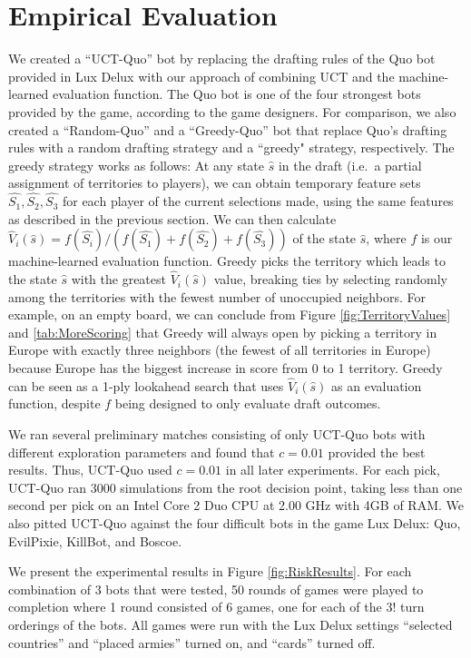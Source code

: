\documentclass[letterpaper]{article}
\numberwithin{equation}{section}
\numberwithin{theorem}{section}
\numberwithin{lemma}{section}
\numberwithin{df}{section}
\begin{document}
\section{Empirical Evaluation}


We created a ``UCT-Quo'' bot by replacing the drafting rules of the Quo bot provided in Lux Delux with our approach of combining UCT and the machine-learned evaluation function.  The Quo bot is one of the four strongest bots provided by the game, according to the game designers.  For comparison, we also created a ``Random-Quo'' and a ``Greedy-Quo'' bot that replace Quo's drafting rules with a random drafting strategy and a ``greedy" strategy, respectively.  The greedy strategy works as follows: At any state $\hat{s}$ in the draft (i.e.~a partial assignment of territories to players), we can obtain temporary feature sets $\hat{S_1}, \hat{S_2}, \hat{S_3}$ for each player of the current selections made, using the same features as described in the previous section.  We can then calculate $\hat{V}_i(\hat{s}) = f(\hat{S_i}) / (f(\hat{S_1}) + f(\hat{S_2}) + f(\hat{S_3}))$ of the state $\hat{s}$, where $f$ is our machine-learned evaluation function.  Greedy picks the territory which leads to the state $\hat{s}$ with the greatest $\hat{V}_i(\hat{s})$ value, breaking ties by selecting randomly among the territories with the fewest number of unoccupied neighbors.  For example, on an empty board, we can conclude from Figure \ref{fig:TerritoryValues} and \ref{tab:MoreScoring} that Greedy will always open by picking a territory in Europe with exactly three neighbors (the fewest of all territories in Europe) because Europe has the biggest increase in score from 0 to 1 territory.  
Greedy can be seen as a 1-ply lookahead search that uses $\hat{V}_i(\hat{s})$ as an evaluation function, despite $f$ being designed to only evaluate draft outcomes.  

We ran several preliminary matches consisting of only UCT-Quo bots with different exploration parameters and found that $c=0.01$ provided the best results.  Thus, UCT-Quo used $c=0.01$ in all later experiments.  For each pick, UCT-Quo ran $3000$ simulations from the root decision point, taking less than one second per pick on an Intel Core 2 Duo CPU at 2.00 GHz with 4GB of RAM.  We also pitted UCT-Quo against the four difficult bots in the game Lux Delux: Quo, EvilPixie, KillBot, and Boscoe.

We present the experimental results in Figure \ref{fig:RiskResults}.  For each combination of 3 bots that were tested, 50 rounds of games were played to completion where 1 round consisted of 6 games, one for each of the $3!$ turn orderings of the bots.  All games were run with the Lux Delux settings ``selected countries'' and ``placed armies'' turned on, and ``cards'' turned off.  
\end{document}
